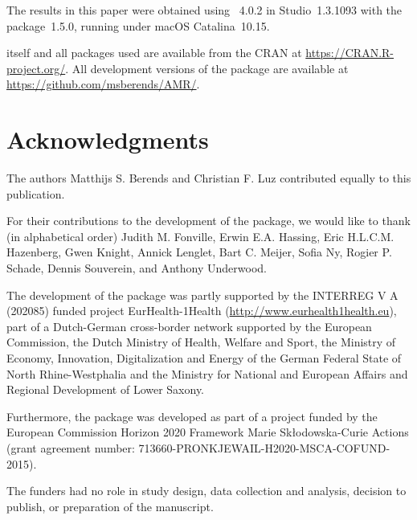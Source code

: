 \documentclass[article, shortnames]{jss}
\begin{document}
The results in this paper were obtained using ~4.0.2 in
Studio~1.3.1093 \citep{RStudio} with the  package~1.5.0,
running under macOS Catalina~10.15.

 itself and all packages used are available from the
CRAN at \url{https://CRAN.R-project.org/}.  All development versions of the
 package are available at \url{https://github.com/msberends/AMR/}.

\section*{Acknowledgments}

The authors Matthijs S.  Berends and Christian F.  Luz contributed equally
to this publication.

For their contributions to the development of the  package, we
would like to thank (in alphabetical order) Judith M.  Fonville, Erwin E.A. 
Hassing, Eric H.L.C.M.  Hazenberg, Gwen Knight, Annick Lenglet, Bart C. 
Meijer, Sofia Ny, Rogier P.  Schade, Dennis Souverein, and Anthony
Underwood.

The development of the  package was partly supported by the
INTERREG V A (202085) funded project EurHealth-1Health
(\url{http://www.eurhealth1health.eu}), part of a Dutch-German cross-border
network supported by the European Commission, the Dutch Ministry of Health,
Welfare and Sport, the Ministry of Economy, Innovation, Digitalization and
Energy of the German Federal State of North Rhine-Westphalia and the
Ministry for National and European Affairs and Regional Development of Lower
Saxony.

Furthermore, the  package was developed as part of a project funded
by the European Commission Horizon 2020 Framework Marie Sk\l{}odowska-Curie
Actions (grant agreement number: 713660-PRONKJEWAIL-H2020-MSCA-COFUND-2015).

The funders had no role in study design, data collection and analysis,
decision to publish, or preparation of the manuscript.

\end{document}
